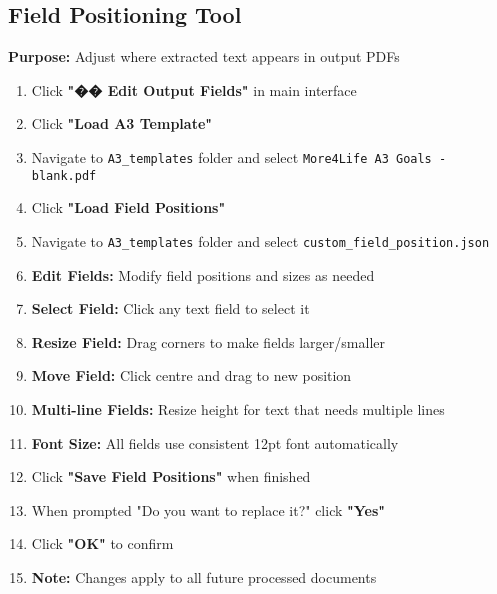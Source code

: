 \documentclass[11pt,a4paper]{article}
\begin{document}
\subsection*{\faEdit\space Field Positioning Tool}
\textbf{Purpose:} Adjust where extracted text appears in output PDFs
\begin{enumerate}[leftmargin=*,itemsep=0pt]
    \item Click \textcolor{primary}{\textbf{"�� Edit Output Fields"}} in main interface
    \item Click \textcolor{primary}{\textbf{"Load A3 Template"}}
    \item Navigate to \texttt{A3\_templates} folder and select \texttt{More4Life A3 Goals - blank.pdf}
    \item Click \textcolor{primary}{\textbf{"Load Field Positions"}}
    \item Navigate to \texttt{A3\_templates} folder and select \texttt{custom\_field\_position.json}
    \item \textbf{Edit Fields:} Modify field positions and sizes as needed
    \item \textbf{Select Field:} Click any text field to select it
    \item \textbf{Resize Field:} Drag corners to make fields larger/smaller
    \item \textbf{Move Field:} Click centre and drag to new position
    \item \textbf{Multi-line Fields:} Resize height for text that needs multiple lines
    \item \textbf{Font Size:} All fields use consistent 12pt font automatically
    \item Click \textcolor{success}{\textbf{"Save Field Positions"}} when finished
    \item When prompted "Do you want to replace it?" click \textcolor{success}{\textbf{"Yes"}}
    \item Click \textcolor{success}{\textbf{"OK"}} to confirm
    \item \textbf{Note:} Changes apply to all future processed documents
\end{enumerate}
\end{document}

